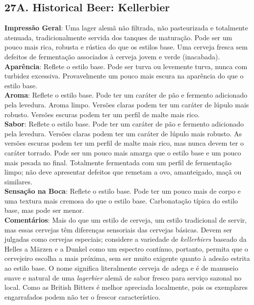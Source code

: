 \subsection*{27A. Historical Beer: Kellerbier}
\textbf{Impressão Geral}: Uma lager alemã não filtrada, não pasteurizada e totalmente atenuada, tradicionalmente servida dos tanques de maturação. Pode ser um pouco mais rica, robusta e rústica do que os estilos base. Uma cerveja fresca sem defeitos de fermentação associados à cerveja jovem e verde (inacabada). \\
\textbf{Aparência}: Reflete o estilo base. Pode ser turva ou levemente turva, nunca com turbidez excessiva. Provavelmente um pouco mais escura na aparência do que o estilo base. \\
\textbf{Aroma}: Reflete o estilo base. Pode ter um caráter de pão e fermento adicionado pela levedura. Aroma limpo. Versões claras podem ter um caráter de lúpulo mais robusto. Versões escuras podem ter um perfil de malte mais rico. \\
\textbf{Sabor}: Reflete o estilo base. Pode ter um caráter de pão e fermento adicionado pela levedura. Versões claras podem ter um caráter de lúpulo mais robusto. As versões escuras podem ter um perfil de malte mais rico, mas nunca devem ter o caráter torrado. Pode ser um pouco mais amarga que o estilo base e um pouco mais pesada no final. Totalmente fermentada com um perfil de fermentação limpo; não deve apresentar defeitos que remetam a ovo, amanteigado, maçã ou similares. \\
\textbf{Sensação na Boca}: Reflete o estilo base. Pode ter um pouco mais de corpo e uma textura mais cremosa do que o estilo base. Carbonatação típica do estilo base, mas pode ser menor. \\
\textbf{Comentários}: Mais do que um estilo de cerveja, um estilo tradicional de servir, mas essas cervejas têm diferenças sensoriais das cervejas básicas. Devem ser julgadas como cervejas especiais; considere a variedade de \textit{kellerbiers} baseado da Helles a Märzen e a Dunkel como um espectro contínuo, portanto, permita que o cervejeiro escolha a mais próxima, sem ser muito exigente quanto à adesão estrita ao estilo base. O nome significa literalmente cerveja de adega e é de manuseio suave e natural de uma \textit{lagerbier} alemã de sabor fresco para serviço sazonal no local. Como as British Bitters é melhor apreciada localmente, pois os exemplares engarrafados podem não ter o frescor característico. \\
